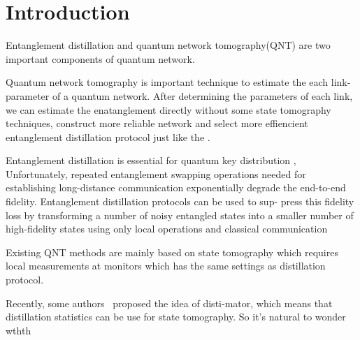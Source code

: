 \section{Introduction}

Entanglement distillation and quantum network tomography(QNT) are two important  components of quantum network. 


Quantum network tomography is important technique to estimate the each link-parameter of a quantum network. After determining the parameters of each link, we can estimate the enatanglement directly without some state tomography techniques, construct more reliable network and select more effiencient entanglement distillation protocol just like the  \cite{Miguel_Ramiro_2018}. 


Entanglement distillation is essential for quantum key distribution  , 
Unfortunately, repeated entanglement swapping operations needed for establishing long-distance communication exponentially degrade the end-to-end fidelity.
Entanglement distillation protocols can be used to sup-
press this fidelity loss by transforming a number of
noisy entangled states into a smaller number of high-fidelity states using only local operations and classical
communication



Existing QNT methods are  mainly based on state tomography which requires local measurements at monitors which has the same settings as distillation protocol. 

Recently, some authors~\cite{Casapao_2025} proposed the idea of disti-mator, which means that distillation statistics can be use for state tomography. So it's natural to wonder wthth

